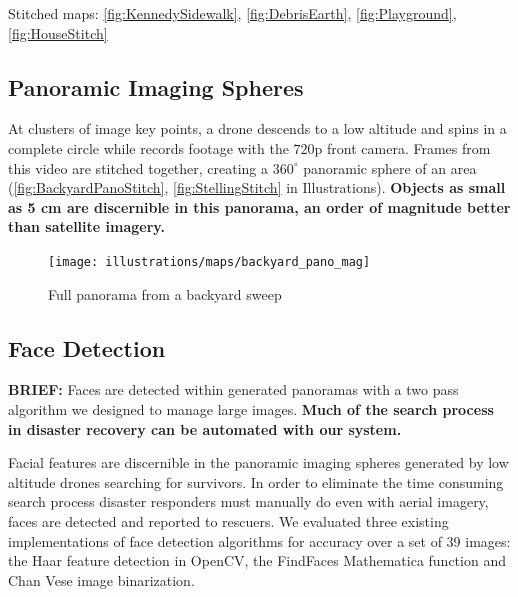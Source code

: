Stitched maps: \autoref{fig:KennedySidewalk}, \autoref{fig:DebrisEarth}, \autoref{fig:Playground}, \autoref{fig:HouseStitch}

\subsection{Panoramic Imaging Spheres}
At clusters of image key points, a drone descends to a low altitude and spins in a complete circle while records footage with the $720$p front camera. Frames from this video are stitched together, creating a $360^{\circ}$ panoramic sphere of an area (\autoref{fig:BackyardPanoStitch}, \autoref{fig:StellingStitch} in Illustrations). \textbf{Objects as small as 5 cm are discernible in this panorama, an order of magnitude better than satellite imagery.}
\begin{figure}[H]
  \caption{Full panorama from a backyard sweep}
  \label{fig:BackyardPanoStitch}
  \centering
    \texttt{[image: illustrations/maps/backyard\_pano\_mag]}
\end{figure}

\subsection{Face Detection}
\textbf{BRIEF:} Faces are detected within generated panoramas with a two pass algorithm we designed to manage large images. \textbf{Much of the search process in disaster recovery can be automated with our system.}

Facial features are discernible in the panoramic imaging spheres generated by low altitude drones searching for survivors. In order to eliminate the time consuming search process disaster responders must manually do even with aerial imagery, faces are detected and reported to rescuers. We evaluated three existing implementations of face detection algorithms for accuracy over a set of 39 images: the Haar feature detection in OpenCV, the FindFaces Mathematica function and Chan Vese image binarization.

